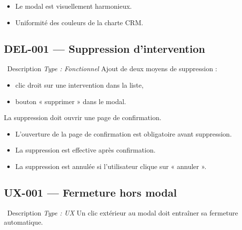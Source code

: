 \documentclass[12pt,a4paper]{article}
\newcommand{\checkmark}{\ding{51}}
\begin{document}
\begin{testbox}
\begin{itemize}[leftmargin=2em, itemsep=2pt]
    \item[\checkmark] Le modal est visuellement harmonieux.
    \item[\checkmark] Uniformité des couleurs de la charte CRM.
\end{itemize}
\end{testbox}

\subsection{DEL-001 — Suppression d'intervention}
\label{subsec:del-001}

\begin{featurebox}{\faTrash\ Description \hfill \textit{Type : Fonctionnel}}
Ajout de deux moyens de suppression :
\begin{itemize}[leftmargin=2em, itemsep=0pt]
    \item clic droit sur une intervention dans la liste,
    \item bouton « supprimer » dans le modal.
\end{itemize}
\vspace{0.3cm}
La suppression doit ouvrir une page de confirmation.
\end{featurebox}

\begin{testbox}
\begin{itemize}[leftmargin=2em, itemsep=2pt]
    \item[\checkmark] L'ouverture de la page de confirmation est obligatoire avant suppression.
    \item[\checkmark] La suppression est effective après confirmation.
    \item[\checkmark] La suppression est annulée si l'utilisateur clique sur « annuler ».
\end{itemize}
\end{testbox}

\subsection{UX-001 — Fermeture hors modal}
\label{subsec:ux-001}

\begin{featurebox}{\faTimes\ Description \hfill \textit{Type : UX}}
Un clic extérieur au modal doit entraîner sa fermeture automatique.
\end{featurebox}
\end{document}
